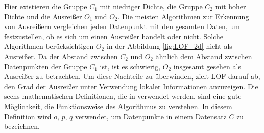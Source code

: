                 Hier existieren die Gruppe $C_1$ mit niedriger Dichte, die Gruppe $C_2$ mit hoher Dichte und die Ausreißer $O_1$ und $O_2$. Die meisten Algorithmen zur Erkennung von Ausreißern vergleichen jeden Datenpunkt mit den gesamten Daten, um festzustellen, ob es sich um einen Ausreißer handelt oder nicht. Solche Algorithmen berücksichtigen $O_2$ in der Abbildung \ref{fig:LOF_2d} nicht als Ausreißer. Da der Abstand zwischen $C_2$ und $O_2$ ähnlich dem Abstand zwischen Datenpunkten der Gruppe $C_1$ ist, ist es schwierig, $O_2$ insgesamt gesehen als Ausreißer zu betrachten. Um diese Nachteile zu überwinden, zielt LOF darauf ab, den Grad der Ausreißer unter Verwendung lokaler Informationen anzuzeigen. Die sechs mathematischen Definitionen, die in \cite{Breunig00} verwendet werden, sind eine gute Möglichkeit, die Funktionsweise des Algorithmus zu verstehen. In diesem Definition wird $o$, $p$, $q$ verwendet, um Datenpunkte in einem Datensatz $C$ zu bezeichnen.
                
